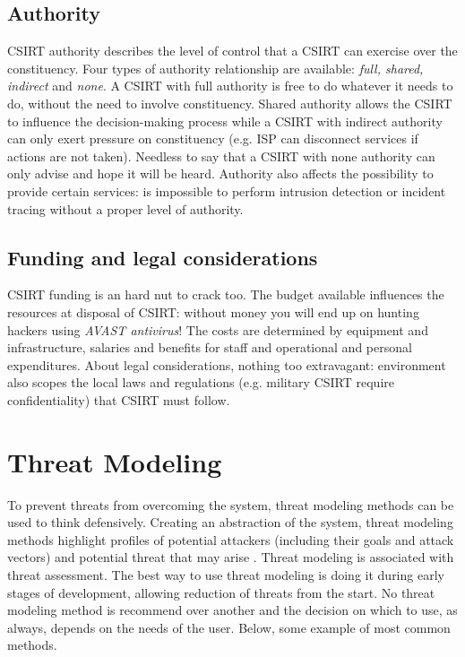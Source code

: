 \subsection{Authority}
CSIRT authority describes the level of control that a CSIRT can exercise over the constituency. Four types of authority relationship are available: \textit{full, shared, indirect} and \textit{none}. A CSIRT with full authority is free to do whatever it needs to do, without the need to involve constituency. Shared authority allows the CSIRT to influence the decision-making process while a CSIRT with indirect authority can only exert pressure on constituency (e.g. ISP can disconnect services if actions are not taken). Needless to say that a CSIRT with none authority can only advise and hope it will be heard. Authority also affects the possibility to provide certain services: is impossible to perform intrusion detection or incident tracing without a proper level of authority.
\subsection{Funding and legal considerations}
CSIRT funding is an hard nut to crack too. The budget available influences the resources at disposal of CSIRT: without money you will end up on hunting hackers using \textit{AVAST antivirus}! The costs are determined by equipment and infrastructure, salaries and benefits for staff and operational and personal expenditures. About legal considerations, nothing too extravagant: environment also scopes the local laws and regulations (e.g. military CSIRT require confidentiality) that CSIRT must follow.

\section{Threat Modeling}
To prevent threats from overcoming the system, threat modeling methods can be used to think defensively. Creating an abstraction of the system, threat modeling methods highlight profiles of potential attackers (including their goals and attack vectors) and potential threat that may arise \cite{Shevchenko2018}. Threat modeling is associated with threat assessment.
The best way to use threat modeling is doing it during early stages of development, allowing reduction of threats from the start. No threat modeling method is recommend over another and the decision on which to use, as always, depends on the needs of the user. Below, some example of most common methods.

